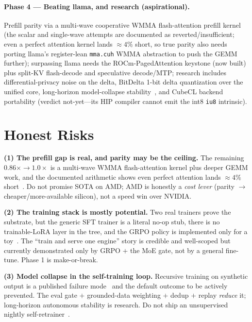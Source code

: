 \documentclass[11pt]{article}
\begin{document}
\paragraph{Phase 4 --- Beating llama, and research (aspirational).} Prefill parity via a multi-wave cooperative WMMA flash-attention prefill kernel~\cite{dao2022} (the scalar and single-wave attempts are documented as reverted/insufficient; even a perfect attention kernel lands $\approx 4\%$ short, so true parity also needs porting llama's register-lean \texttt{mma.cuh} WMMA abstraction to push the GEMM further); surpassing llama needs the ROCm-PagedAttention keystone (now built) plus split-KV flash-decode and speculative decode/MTP; research includes differential-privacy noise on the delta, BitDelta 1-bit delta quantization over the unified core, long-horizon model-collapse stability~\cite{shumailov2024}, and CubeCL backend portability (verdict not-yet---its HIP compiler cannot emit the int8 \texttt{iu8} intrinsic).

\section{Honest Risks}
\label{sec:risks}

\textbf{(1) The prefill gap is real, and parity may be the ceiling.} The remaining $0.86\times\to 1.0\times$ is a multi-wave WMMA flash-attention kernel plus deeper GEMM work, and the documented arithmetic shows even perfect attention lands $\approx 4\%$ short~\cite{hanzo-rocm}. Do not promise SOTA on AMD; AMD is honestly a \emph{cost lever} (parity $\to$ cheaper/more-available silicon), not a speed win over NVIDIA.

\textbf{(2) The training stack is mostly potential.} Two real trainers prove the substrate, but the generic SFT trainer is a literal no-op stub, there is no trainable-LoRA layer in the tree, and the GRPO policy is implemented only for a toy~\cite{hanzo-train}. The ``train and serve one engine'' story is credible and well-scoped but currently demonstrated only by GRPO $+$ the MoE gate, not by a general fine-tune. Phase 1 is make-or-break.

\textbf{(3) Model collapse in the self-training loop.} Recursive training on synthetic output is a published failure mode~\cite{shumailov2024} and the default outcome to be actively prevented. The eval gate $+$ grounded-data weighting $+$ dedup $+$ replay \emph{reduce} it; long-horizon autonomous stability is research. Do not ship an unsupervised nightly self-retrainer~\cite{hanzo-clp}.
\end{document}
